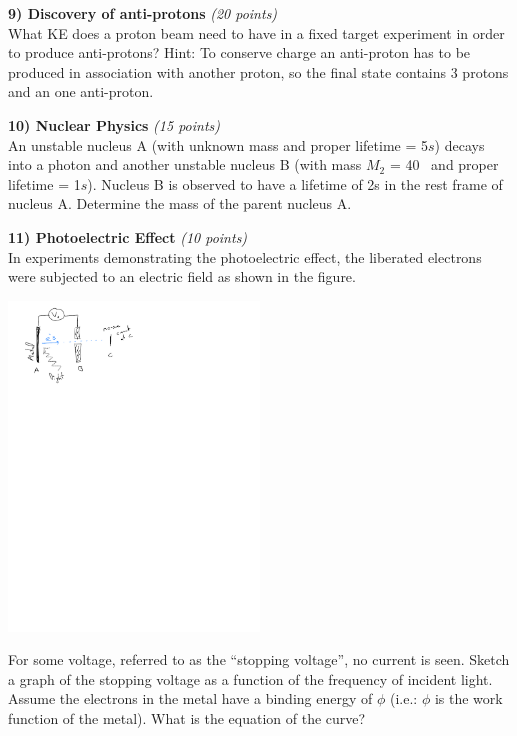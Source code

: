 {\vfill

\clearpage

\textbf{9) Discovery of anti-protons}  \hfill \textit{(20 points)}\\
What KE does a proton beam need to have in a fixed target experiment in order to produce anti-protons?
Hint: To conserve charge an anti-proton has to be produced in association with another proton, so the final state contains 3 protons and an one anti-proton.

\clearpage

\textbf{10) Nuclear Physics }\hfill \textit{(15 points)}\\
An unstable nucleus A (with unknown mass and proper lifetime = 5$s$) decays into a photon and another unstable nucleus B (with mass $M_2$ = 40 \GeV\ and proper lifetime = 1$s$).
Nucleus B is observed to have a lifetime of 2s in the rest frame of nucleus A. 
Determine the mass of the parent nucleus A.

\clearpage

\textbf{11) Photoelectric Effect }\hfill \textit{(10 points)}\\
In experiments demonstrating the photoelectric effect, the liberated electrons were subjected to an electric field as shown in the figure.
\begin{center}
\includegraphics[width=0.5\textwidth]{./PhotoelectricExp.pdf}
\end{center}
For some voltage, referred to as the ``stopping voltage'', no current is seen.
Sketch a graph of the stopping voltage as a function of the frequency of incident light.
Assume the electrons in the metal have a binding energy of $\phi$ (i.e.: $\phi$ is the  work function of the metal).
What is the equation of the curve?


}
